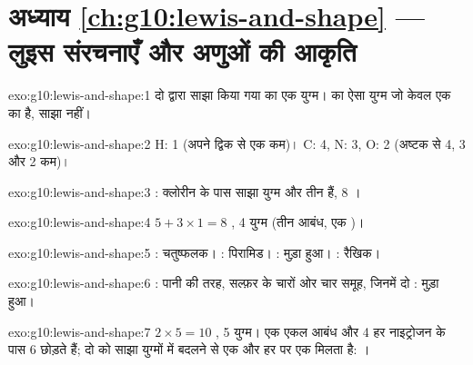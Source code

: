 \section*{अध्याय \ref{ch:g10:lewis-and-shape} --- लुइस संरचनाएँ और अणुओं की आकृति}

\begin{solution}{exo:g10:lewis-and-shape:1}
दो  द्वारा साझा किया गया  का एक युग्म। 
का ऐसा युग्म जो केवल एक  का है, साझा नहीं।
\end{solution}

\begin{solution}{exo:g10:lewis-and-shape:2}
H: 1 (अपने द्विक से एक  कम)। C: 4, N: 3, O: 2 (अष्टक से 4, 3 और 2
 कम)।
\end{solution}

\begin{solution}{exo:g10:lewis-and-shape:3}
: क्लोरीन के पास साझा युग्म और तीन
 हैं, 8 ।
\end{solution}

\begin{solution}{exo:g10:lewis-and-shape:4}
$5 + 3 \times 1 = 8$ , 4 युग्म (तीन आबंध, एक )।
\end{solution}

\begin{solution}{exo:g10:lewis-and-shape:5}
: चतुष्फलक। : पिरामिड। : मुड़ा हुआ। :
रैखिक।
\end{solution}

\begin{solution}{exo:g10:lewis-and-shape:6}
: पानी की तरह, सल्फ़र के चारों ओर चार समूह,
जिनमें दो : मुड़ा हुआ।
\end{solution}

\begin{solution}{exo:g10:lewis-and-shape:7}
$2 \times 5 = 10$ , 5 युग्म। एक एकल आबंध और 4  हर
नाइट्रोजन के पास 6  छोड़ते हैं; दो  को साझा युग्मों में बदलने
से एक  और हर  पर एक  मिलता है:
।
\end{solution}

